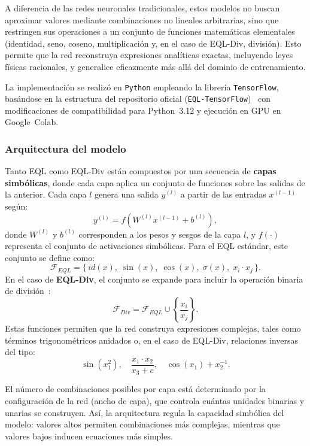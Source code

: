 A diferencia de las redes neuronales tradicionales, estos modelos no buscan aproximar valores mediante combinaciones no lineales arbitrarias, sino que restringen sus operaciones a un conjunto de funciones matemáticas elementales (identidad, seno, coseno, multiplicación y, en el caso de EQL-Div, división). Esto permite que la red reconstruya expresiones analíticas exactas, incluyendo leyes físicas racionales, y generalice eficazmente más allá del dominio de entrenamiento.

La implementación se realizó en \texttt{Python} empleando la librería \texttt{TensorFlow}, basándose en la estructura del repositorio oficial (\texttt{EQL-TensorFlow})~\cite{3} con modificaciones de compatibilidad para Python~3.12 y ejecución en GPU en Google~Colab.

\subsubsection{Arquitectura del modelo}

Tanto EQL como EQL-Div están compuestos por una secuencia de \textbf{capas simbólicas}, donde cada capa aplica un conjunto de funciones sobre las salidas de la anterior. 
Cada capa $l$ genera una salida $y^{(l)}$ a partir de las entradas $x^{(l-1)}$ según:
\begin{equation}
    y^{(l)} = f\!\left(W^{(l)} x^{(l-1)} + b^{(l)}\right),
\end{equation}
donde $W^{(l)}$ y $b^{(l)}$ corresponden a los pesos y sesgos de la capa $l$, y $f(\cdot)$ representa el conjunto de activaciones simbólicas. 
Para el EQL estándar, este conjunto se define como:
\[
\mathcal{F}_{EQL} = \{\, id(x),\; \sin(x),\; \cos(x),\; \sigma(x),\; x_i \cdot x_j \,\}.
\]
En el caso de \textbf{EQL-Div}, el conjunto se expande para incluir la operación binaria de división~\cite{2}:
\[
\mathcal{F}_{Div} = \mathcal{F}_{EQL} \cup \left\{ \frac{x_i}{x_j} \right\}.
\]
Estas funciones permiten que la red construya expresiones complejas, tales como términos trigonométricos anidados o, en el caso de EQL-Div, relaciones inversas del tipo:
\[
\sin(x_1^2),\quad \frac{x_1 \cdot x_2}{x_3 + c},\quad \cos(x_1) + x_2^{-1}.
\]

El número de combinaciones posibles por capa está determinado por la configuración de la red (ancho de capa), que controla cuántas unidades binarias y unarias se construyen. 
Así, la arquitectura regula la capacidad simbólica del modelo: valores altos permiten combinaciones más complejas, mientras que valores bajos inducen ecuaciones más simples.

